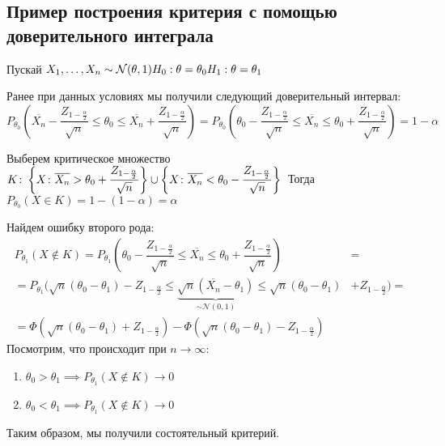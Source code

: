 \subsection{Пример построения критерия с помощью доверительного интеграла}
\begin{example}
Пускай $X_1,\ldots,X_n\sim\mathcal{N}(\theta,1)\\ H_0:\theta=\theta_0\\ H_1:\theta=\theta_1$

Ранее при данных условиях мы получили следующий доверительный интервал:
$$P_{\theta_0}\left(\overline{X_n}-\dfrac{Z_{1-\frac{\alpha}{2}}}{\sqrt{n}}\leq \theta_0\leq \overline{X_n}+\dfrac{Z_{1-\frac{\alpha}{2}}}{\sqrt{n}}\right)=P_{\theta_0}\left(\theta_0-\dfrac{Z_{1-\frac{\alpha}{2}}}{\sqrt{n}}\leq \overline{X_n}\leq \theta_0+\dfrac{Z_{1-\frac{\alpha}{2}}}{\sqrt{n}}\right)=1-\alpha$$

Выберем критическое множество $K\colon \left\{X\colon
\overline{X_n}>\theta_0+\dfrac{Z_{1-\frac{\alpha}{2}}}{\sqrt{n}}\right\}\cup\left\{X\colon \overline{X_n}<\theta_0-\dfrac{Z_{1-\frac{\alpha}{2}}}{\sqrt{n}}\right\}\\$
Тогда $P_{\theta_0}(X\in K)=1-(1-\alpha)=\alpha$

Найдем ошибку второго рода: 
        \begin{align}
            P_{\theta_1}(X\notin K)=P_{\theta_1}\left(\theta_0-\dfrac{Z_{1-\frac{\alpha}{2}}}{\sqrt{n}}\leq \overline{X_n}\leq \theta_0+\dfrac{Z_{1-\frac{\alpha}{2}}}{\sqrt{n}}\right)&=
        \\
        =P_{\theta_1}\Bigg(\sqrt{n}\left(\theta_0-\theta_1\right)-Z_{1-\frac{\alpha}{2}}\leq \underbrace{\sqrt{n}\left(\overline{X_n}-\theta_1\right)}_{\sim\mathcal{N}(0,1)}\leq \sqrt{n}\left(\theta_0-\theta_1\right)&+Z_{1-\frac{\alpha}{2}}\Bigg)=
        \\
        =\Phi\left(\sqrt{n}\left(\theta_0-\theta_1\right)+Z_{1-\frac{\alpha}{2}}\right)-\Phi\left(\sqrt{n}\left(\theta_0-\theta_1\right)-Z_{1-\frac{\alpha}{2}}\right)
        \end{align}
Посмотрим, что происходит при $n\rightarrow \infty$:
\begin{enumerate}
    \item $\theta_0>\theta_1\implies P_{\theta_1}(X\notin K)\rightarrow 0$
    \item $\theta_0<\theta_1\implies P_{\theta_1}(X\notin K)\rightarrow 0$
\end{enumerate}
Таким образом, мы получили состоятельный критерий.
\end{example}

